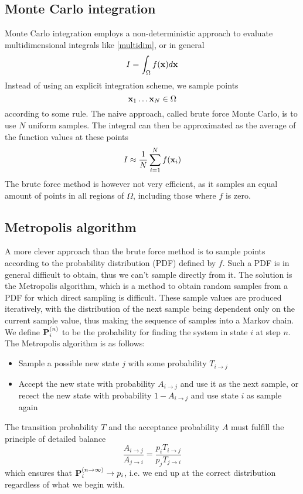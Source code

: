 \documentclass[english, a4paper]{article}
\begin{document}
\subsection{Monte Carlo integration}

Monte Carlo integration employs a non-deterministic approach to evaluate multidimensional integrals like \eqref{multidim}, or
in general
\begin{equation}
 I = \int_\Omega f({\bf x}) d{\bf x}
\end{equation}
Instead of using an explicit integration scheme, we sample points
\begin{equation}
 {\bf x}_1 \dots {\bf x}_N \in \Omega
\end{equation}
according to some rule. The naive approach, called brute force Monte Carlo, is to use $N$ uniform samples. 
The integral can then be approximated as the average of the function values at these points
\begin{equation}
 I \approx \frac{1}{N} \sum_{i=1}^N f({\bf x}_i)
\end{equation}
The brute force method is however not very efficient, as it samples an equal amount of points in all regions of $\Omega$, 
including those where $f$ is zero. 

\subsection{Metropolis algorithm}

A more clever approach than the brute force method is to sample points according to the probability distribution (PDF)
defined by $f$. Such a PDF is in general difficult to obtain, thus we can't sample directly from it.
The solution is the Metropolis algorithm, which is a method to obtain random samples from a PDF for which 
direct sampling is difficult. 
These sample values are produced iteratively, with the distribution of the next sample being dependent only on 
the current sample value, thus making the sequence of samples into a Markov chain.
We define ${\bf P}_i^{(n)}$ to be the 
probability for finding the system in state $i$ at step $n$. 
The Metropolis algorithm is as follows:
\begin{itemize}
 \item Sample a possible new state $j$ with some probability $T_{i\rightarrow j}$
 \item Accept the new state with probability $A_{i\rightarrow j}$ and use it as the next sample, or
 recect the new state with probability $1 - A_{i\rightarrow j}$ and use state $i$ as sample again
\end{itemize}
The transition probability $T$ and the acceptance probability $A$ must fulfill the principle of detailed balance
\begin{equation}
 \frac{A_{i\rightarrow j}}{A_{j\rightarrow i}} = \frac{p_i T_{i\rightarrow j}}{p_j T_{j\rightarrow i}}
 \label{detailedbalance}
\end{equation}
which ensures that ${\bf P}_i^{(n\rightarrow \infty)} \rightarrow p_i$, i.e. we end up at the correct 
distribution regardless of what we begin with. \\
\end{document}

